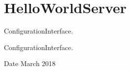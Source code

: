\hypertarget{group__helloWorldServer}{}\section{Hello\+World\+Server}
\label{group__helloWorldServer}


Configuration\+Interface.  


Configuration\+Interface. 

\begin{DoxyDate}{Date}
March 2018 
\end{DoxyDate}
